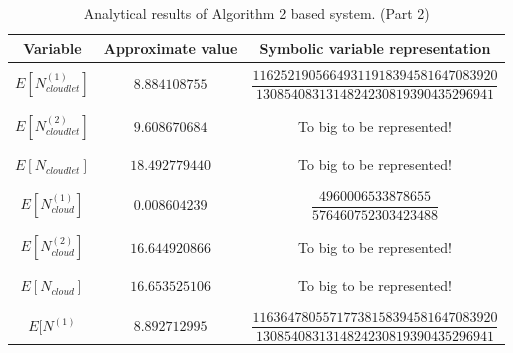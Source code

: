 \documentclass[10pt,a4paper]{article}
\begin{document}
\begin{table}[h!]
\caption{Analytical results of Algorithm 2 based system. (Part 2)}
\begin{adjustbox}{center=\textwidth}
	
     \begin{tabular}{c|c|c}
     \toprule
     \textbf{Variable} & \textbf{Approximate value} & \textbf{Symbolic variable representation} \\
     \toprule
	 
	 &&\\

$E[N^{(1)}_{cloudlet}]$ & $8.884108755$ & $\dfrac{11625219056649311918394581647083920}{1308540831314824230819390435296941}$ \\
     
     &&\\\hline &&\\
     
     $E[N^{(2)}_{cloudlet}]$ & $9.608670684$ & To big to be represented! \\
     
	 &&\\\hline &&\\
     
     $E[N_{cloudlet}]$ & $18.492779440$ & To big to be represented! \\     
     
	 &&\\\hline &&\\
     
     $E[N^{(1)}_{cloud}]$ & $0.008604239$ & $\dfrac{4960006533878655}{576460752303423488}$ \\

&&\\\hline &&\\

	 $E[N^{(2)}_{cloud}]$ & $16.644920866$ & To big to be represented! \\

	 &&\\\hline &&\\
	
	 $E[N_{cloud}]$ & $16.653525106$ & To big to be represented! \\

     &&\\\hline &&\\

     $E[N^{(1)}$ & $8.892712995$ & $\dfrac{11636478055717738158394581647083920}{1308540831314824230819390435296941}$ \\


\end{tabular}
\end{adjustbox}
\end{table}
\end{document}
